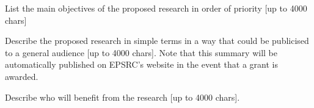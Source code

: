 
List the main objectives of the proposed research in order of priority [up to 4000 chars]

Describe the proposed research in simple terms in a way that could be publicised to a general audience [up to 4000 chars]. Note that this summary will be automatically published on EPSRC’s website in the event that a grant is awarded.

Describe who will benefit from the research [up to 4000 chars].


